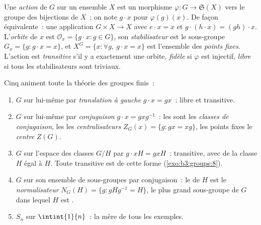 \begin{definition}\label{def:b3:groups:action}
Une \emph{action} de $G$ sur un ensemble
$X$ est un morphisme $\varphi \colon G \to \mathfrak{S}(X)$ vers
le groupe des bijections de $X$~; on note $g \cdot x$ pour
$\varphi(g)(x)$. De façon équivalente~: une application $G \times
X \to X$ avec $e \cdot x = x$ et $g \cdot (h \cdot x) = (gh)
\cdot x$. L'\emph{orbite} de $x$ est $\mathcal O_x
= \{g \cdot x : g \in G\}$, son \emph{stabilisateur}
est le sous-groupe $G_x = \{g : g\cdot x = x\}$, et $X^G = \{x :
\forall g,\ g \cdot x = x\}$ est l'ensemble des \emph{points
fixes}. L'action est \emph{transitive} s'il y a exactement une
orbite, \emph{fidèle} si $\varphi$ est injectif, \emph{libre} si
tous les stabilisateurs sont triviaux.
\end{definition}

\begin{example}\label{ex:b3:groups:actions}
Cinq  animent toute la théorie des groupes finis~:
\begin{enumerate}
  \item $G$ sur lui-même par \emph{translation à gauche} $g \cdot
        x = gx$~: libre et transitive.
  \item $G$ sur lui-même par \emph{conjugaison} $g \cdot x =
        gxg^{-1}$~: les  sont les \emph{classes de
        conjugaison}, les
         les \emph{centralisateurs}
        $Z_G(x) = \{g : gx = xg\}$, les points fixes le
        \emph{centre} $Z(G)$.
  \item $G$ sur l'espace des classes $G/H$ par $g \cdot xH =
        gxH$~: transitive, avec  de la classe $H$
        égal à $H$. Toute  transitive est de cette forme
        (\cref{exo:b3:groups:8}).
  \item $G$ sur son ensemble de sous-groupes par conjugaison~: le
         de $H$ est le
        \emph{normalisateur} $N_G(H) = \{g :
        gHg^{-1} = H\}$, le plus grand sous-groupe de $G$ dans
        lequel $H$ est .
  \item $S_n$ sur $\intint{1}{n}$~: la mère de tous les exemples.
\end{enumerate}
\end{example}

